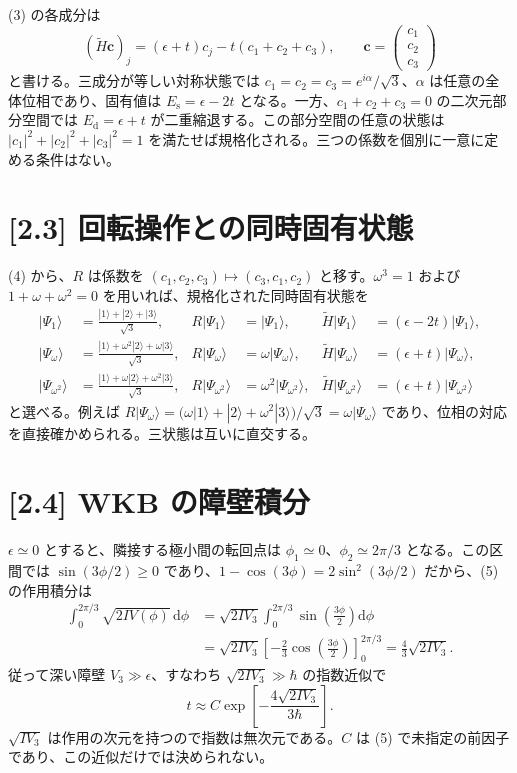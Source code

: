 \documentclass[11pt,a4paper]{article}
\begin{document}
(3) の各成分は
\begin{equation}
(\widetilde H\boldsymbol c)_j=(\epsilon+t)c_j-t(c_1+c_2+c_3),
\qquad \boldsymbol c=\begin{pmatrix}c_1\\c_2\\c_3\end{pmatrix}
\end{equation}
と書ける。三成分が等しい対称状態では $c_1=c_2=c_3=e^{i\alpha}/\sqrt3$、$\alpha$ は任意の全体位相であり、固有値は $\boxed{E_{\mathrm s}=\epsilon-2t}$ となる。一方、$c_1+c_2+c_3=0$ の二次元部分空間では $\boxed{E_{\mathrm d}=\epsilon+t}$ が二重縮退する。この部分空間の任意の状態は $|c_1|^2+|c_2|^2+|c_3|^2=1$ を満たせば規格化される。三つの係数を個別に一意に定める条件はない。

\section*{[2.3] 回転操作との同時固有状態}
(4) から、$R$ は係数を $(c_1,c_2,c_3)\mapsto(c_3,c_1,c_2)$ と移す。$\omega^3=1$ および $1+\omega+\omega^2=0$ を用いれば、規格化された同時固有状態を
\begin{align}
\boxed{|\Psi_1\rangle}&=\frac{|1\rangle+|2\rangle+|3\rangle}{\sqrt3},
& R|\Psi_1\rangle&=|\Psi_1\rangle,
& \widetilde H|\Psi_1\rangle&=(\epsilon-2t)|\Psi_1\rangle,\\
\boxed{|\Psi_{\omega}\rangle}&=\frac{|1\rangle+\omega^2|2\rangle+\omega|3\rangle}{\sqrt3},
& R|\Psi_{\omega}\rangle&=\omega|\Psi_{\omega}\rangle,
& \widetilde H|\Psi_{\omega}\rangle&=(\epsilon+t)|\Psi_{\omega}\rangle,\\
\boxed{|\Psi_{\omega^2}\rangle}&=\frac{|1\rangle+\omega|2\rangle+\omega^2|3\rangle}{\sqrt3},
& R|\Psi_{\omega^2}\rangle&=\omega^2|\Psi_{\omega^2}\rangle,
& \widetilde H|\Psi_{\omega^2}\rangle&=(\epsilon+t)|\Psi_{\omega^2}\rangle
\end{align}
と選べる。例えば $R|\Psi_{\omega}\rangle=(\omega|1\rangle+|2\rangle+\omega^2|3\rangle)/\sqrt3=\omega|\Psi_{\omega}\rangle$ であり、位相の対応を直接確かめられる。三状態は互いに直交する。

\section*{[2.4] WKB の障壁積分}
$\epsilon\simeq0$ とすると、隣接する極小間の転回点は $\phi_1\simeq0$、$\phi_2\simeq2\pi/3$ となる。この区間では $\sin(3\phi/2)\geq0$ であり、$1-\cos(3\phi)=2\sin^2(3\phi/2)$ だから、(5) の作用積分は
\begin{align}
\int_0^{2\pi/3}\!\sqrt{2I V(\phi)}\,\mathrm d\phi
&=\sqrt{2IV_3}\int_0^{2\pi/3}\sin\!\left(\frac{3\phi}{2}\right)\mathrm d\phi\\
&=\sqrt{2IV_3}\left[-\frac23\cos\!\left(\frac{3\phi}{2}\right)\right]_0^{2\pi/3}
=\frac43\sqrt{2IV_3}.
\end{align}
従って深い障壁 $V_3\gg\epsilon$、すなわち $\sqrt{2IV_3}\gg\hbar$ の指数近似で
\begin{equation}
\boxed{t\approx C\exp\!\left[-\frac{4\sqrt{2IV_3}}{3\hbar}\right]}.
\end{equation}
$\sqrt{IV_3}$ は作用の次元を持つので指数は無次元である。$C$ は (5) で未指定の前因子であり、この近似だけでは決められない。
\end{document}
